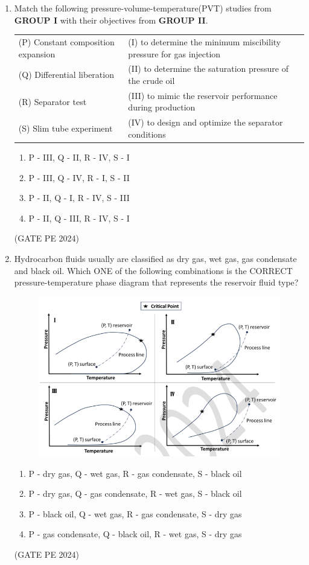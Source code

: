 \documentclass[journal,12pt,onecolumn]{IEEEtran}
\theoremstyle{remark}
\begin{document}
\begin{enumerate}
\item Match the following pressure-volume-temperature(PVT) studies from \textbf{GROUP I} with their objectives from \textbf{GROUP II}.
\begin{tabular}{ll}
(P) Constant composition expansion& (I) to determine the minimum miscibility pressure for gas injection\\
(Q) Differential liberation& (II) to determine the saturation pressure of the crude oil\\
(R) Separator test & (III) to mimic the reservoir performance during production\\
(S) Slim tube experiment & (IV) to design and optimize the separator conditions\\
\end{tabular}
\begin{enumerate}
    \item P - III, Q - II, R - IV, S - I 
    \item P - III, Q - IV, R - I, S - II 
    \item P - II, Q - I, R - IV, S - III 
    \item P - II, Q - III, R - IV, S - I
\end{enumerate}
\hfill{(GATE PE 2024)}

\item Hydrocarbon fluids usually are classified as dry gas, wet gas, gas condensate and black oil. Which ONE of the following combinations is the CORRECT pressure-temperature phase diagram that represents the reservoir fluid type?
\begin{figure}[H]
    \centering
    \includegraphics[width=0.5\columnwidth]{LQ_40.png}
    \caption{}
    \label{fig:placeholder}
\end{figure}
\begin{enumerate}
    \item P - dry gas, Q - wet gas, R - gas condensate, S - black oil 
    \item P - dry gas, Q - gas condensate, R - wet gas, S - black oil 
    \item P - black oil, Q - wet gas, R - gas condensate, S - dry gas 
    \item P - gas condensate, Q - black oil, R - wet gas, S - dry gas
\end{enumerate}
\hfill{(GATE PE 2024)}


\end{enumerate}
\end{document}
